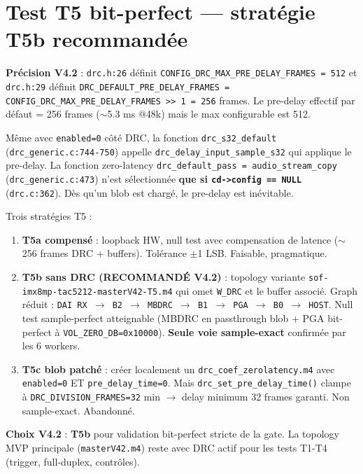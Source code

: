 \documentclass[11pt,a4paper]{article}
\begin{document}
\section{Test T5 bit-perfect --- stratégie T5b recommandée}\label{sec:t5}

\textbf{Précision V4.2} : \texttt{drc.h:26} définit \texttt{CONFIG\_DRC\_MAX\_PRE\_DELAY\_FRAMES = 512} et \texttt{drc.h:29} définit \texttt{DRC\_DEFAULT\_PRE\_DELAY\_FRAMES = CONFIG\_DRC\_MAX\_PRE\_DELAY\_FRAMES >> 1 = 256} frames. Le pre-delay effectif par défaut = 256 frames ($\sim$5.3 ms @48k) mais le max configurable est 512.

Même avec \texttt{enabled=0} côté DRC, la fonction \texttt{drc\_s32\_default} (\texttt{drc\_generic.c:744-750}) appelle \texttt{drc\_delay\_input\_sample\_s32} qui applique le pre-delay. La fonction zero-latency \texttt{drc\_default\_pass = audio\_stream\_copy} (\texttt{drc\_generic.c:473}) n'est sélectionnée \textbf{que si \texttt{cd->config == NULL}} (\texttt{drc.c:362}). Dès qu'un blob est chargé, le pre-delay est inévitable.

Trois stratégies T5 :

\begin{enumerate}[leftmargin=*, itemsep=1pt]
  \item \textbf{T5a compensé} : loopback HW, null test avec compensation de latence ($\sim$256 frames DRC + buffers). Tolérance $\pm$1 LSB. Faisable, pragmatique.
  \item \textbf{T5b sans DRC \textcolor{cok}{(RECOMMANDÉ V4.2)}} : topology variante \texttt{sof-imx8mp-tac5212-masterV42-T5.m4} qui omet \texttt{W\_DRC} et le buffer associé. Graph réduit : \texttt{DAI RX $\to$ B2 $\to$ MBDRC $\to$ B1 $\to$ PGA $\to$ B0 $\to$ HOST}. Null test sample-perfect atteignable (MBDRC en passthrough blob + PGA bit-perfect à \texttt{VOL\_ZERO\_DB=0x10000}). \textbf{Seule voie sample-exact} confirmée par les 6 workers.
  \item \textbf{T5c blob patché} : créer localement un \texttt{drc\_coef\_zerolatency.m4} avec \texttt{enabled=0} ET \texttt{pre\_delay\_time=0}. Mais \texttt{drc\_set\_pre\_delay\_time()} clampe à \texttt{DRC\_DIVISION\_FRAMES=32} min $\to$ delay minimum 32 frames garanti. Non sample-exact. Abandonné.
\end{enumerate}

\textbf{Choix V4.2} : \textbf{T5b} pour validation bit-perfect stricte de la gate. La topology MVP principale (\texttt{masterV42.m4}) reste avec DRC actif pour les tests T1-T4 (trigger, full-duplex, contrôles).
\end{document}
